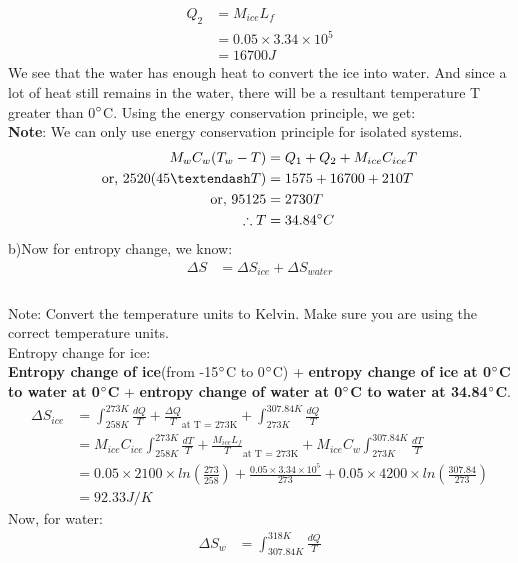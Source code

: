 \begin{enumerate}
\begin{align*}
    Q_2 &= M_{ice}L_f\\
     &= 0.05 \times 3.34 \times 10^5 \\
     &= 16700 J 
\end{align*}
We see that the water has enough heat to convert the ice into water. And since a lot of heat still remains in the water, there will be a resultant temperature T greater than 0$\degree$C. Using the energy conservation principle, we get: \\
\textbf{Note}: We can only use energy conservation principle for isolated systems.
\begin{align*}
    M_wC_w(T_w - T) &=  Q_1 + Q_2 + M_{ice}C_{ice}T\\
    \text{or, }2520 (45 – T)  &=  1575 + 16700 + 210T \\
    \text{or, }95125  &=  2730T\\
    \therefore T &= 34.84\degree C
\end{align*}
b)Now for entropy change, we know: \\
\begin{align*}
    \Delta S &= \Delta S_{ice} + \Delta S_{water}\\
\end{align*}  \\
Note: Convert the temperature units to Kelvin. Make sure you are using the correct temperature units.\\
Entropy change for ice:\\
\textbf{Entropy change of ice}(from -15$\degree$C to 0$\degree$C) + \textbf{entropy change of ice at 0$\degree$C to water at 0$\degree$C} + \textbf{entropy change of water at 0$\degree$C to water at 34.84$\degree$C}. 
\begin{align*}
    \Delta S_{ice}  &=  \int_{258K}^{273K} \frac{dQ}{T}   +   \frac{\Delta Q}{T}_\text{at T = 273K}   +   \int_{273K}^{307.84K} \frac{dQ}{T}\\
    &= M_{ice}C_{ice}\int_{258K}^{273K} \frac{dT}{T} + \frac{M_{ice}L_f}{T}_\text{at T = 273K} + M_{ice}C_{w}\int_{273K}^{307.84K} \frac{dT}{T}\\
    &=0.05\times2100\times ln\left(\frac{273}{258}\right) +\frac{0.05 \times 3.34 \times 10^5}{273} + 0.05\times 4200\times ln\left(\frac{307.84}{273}\right)\\
    &=92.33 J/K  
\end{align*}
Now, for water: \\
\begin{align*}
    \Delta S_{w} &= \int_{307.84K}^{318K} \frac{dQ}{T}\\

\end{align*}
\end{enumerate}
